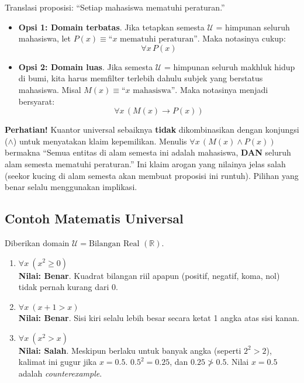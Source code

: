 \begin{contoh}
Translasi proposisi: ``Setiap mahasiswa mematuhi peraturan.''
\begin{itemize}
    \item \textbf{Opsi 1: Domain terbatas}. Jika tetapkan semesta $\mathcal{U}$ = himpunan seluruh mahasiswa, let $P(x) \equiv \text{``}x \text{ mematuhi peraturan''}$. Maka notasinya cukup:
    \[ \forall x \, P(x) \]
    
    \item \textbf{Opsi 2: Domain luas}. Jika semesta $\mathcal{U}$ = himpunan seluruh makhluk hidup di bumi, kita harus memfilter terlebih dahulu subjek yang berstatus mahasiswa. Misal $M(x) \equiv \text{``}x \text{ mahasiswa''}$. Maka notasinya menjadi bersyarat:
    \[ \forall x \, (M(x) \rightarrow P(x)) \]
\end{itemize}
\end{contoh}

\begin{catatan}
\textbf{Perhatian!} Kuantor universal sebaiknya \textbf{tidak} dikombinasikan dengan konjungsi ($\land$) untuk menyatakan klaim kepemilikan. Menulis $\forall x \, (M(x) \land P(x))$ bermakna ``Semua entitas di alam semesta ini adalah mahasiswa, \textbf{DAN} seluruh alam semesta mematuhi peraturan.'' Ini klaim arogan yang nilainya jelas salah (seekor kucing di alam semesta akan membuat proposisi ini runtuh). Pilihan yang benar selalu menggunakan implikasi.
\end{catatan}

\subsection{Contoh Matematis Universal}

\begin{contoh}
Diberikan domain $\mathcal{U} = \text{Bilangan Real } (\mathbb{R})$.
\begin{enumerate}
    \item $\forall x \ (x^2 \geq 0)$ \\ \textbf{Nilai: Benar}. Kuadrat bilangan riil apapun (positif, negatif, koma, nol) tidak pernah kurang dari 0.
    \item $\forall x \ (x + 1 > x)$ \\ \textbf{Nilai: Benar}. Sisi kiri selalu lebih besar secara ketat 1 angka atas sisi kanan.
    \item $\forall x \ (x^2 > x)$ \\ \textbf{Nilai: Salah}. Meskipun berlaku untuk banyak angka (seperti $2^2 > 2$), kalimat ini gugur jika $x = 0.5$. $0.5^2 = 0.25$, dan $0.25 \not> 0.5$. Nilai $x=0.5$ adalah \textit{counterexample}.
\end{enumerate}
\end{contoh}
